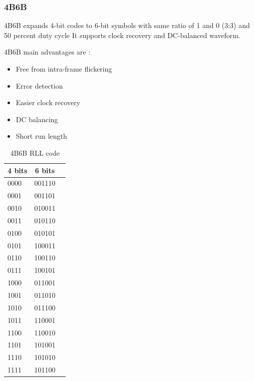 \subsubsection{4B6B}

4B6B expands 4-bit codes to 6-bit symbols with same ratio of 1 and 0 (3:3) and 50 percent duty cycle
It supports clock recovery and DC-balanced waveform.

4B6B main advantages are : 

\begin{itemize}
\item Free from intra-frame flickering
\item Error detection
\item Easier clock recovery
\item DC balancing
\item Short run length
\end{itemize}

\begin{table}[htbp]
\begin{center}
\begin{tabular}{|l|c|r|}
  \hline
  4 bits & 6 bits \\
  \hline
  0000 & 001110 \\
  0001 & 001101 \\
  0010 & 010011 \\
  0011 & 010110 \\
  0100 & 010101 \\
  0101 & 100011 \\
  0110 & 100110 \\
  0111 & 100101 \\
  1000 & 011001 \\
  1001 & 011010 \\
  1010 & 011100 \\
  1011 & 110001 \\
  1100 & 110010 \\
  1101 & 101001 \\
  1110 & 101010 \\
  1111 & 101100 \\
  \hline
\end{tabular}
\end{center}
\caption{4B6B RLL code}
\label{tab:4b6b}
\end{table}

